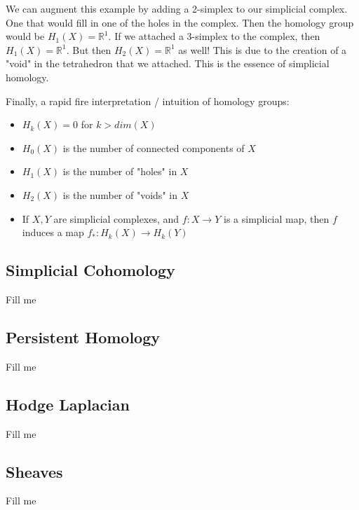 \documentclass[12pt]{article}
\theoremstyle{plain}
\theoremstyle{definition}
\begin{document}
We can augment this example by adding a 2-simplex to our simplicial complex. One that would fill in one of the holes
in the complex. Then the homology group would be $H_1(X) = \mathbb{R}^1$. If we attached a 3-simplex to the complex, 
then $H_1(X) = \mathbb{R}^1$. But then $H_2(X) = \mathbb{R}^1$ as well! This is due to the creation of a "void" in the
tetrahedron that we attached.  This is the essence of simplicial homology.

Finally, a rapid fire interpretation / intuition of homology groups:

\begin{itemize}

\item $H_k(X) = 0$ for $k > dim(X)$

\item $H_0(X)$ is the number of connected components of $X$

\item $H_1(X)$ is the number of "holes" in $X$

\item $H_2(X)$ is the number of "voids" in $X$

\item If $X, Y$ are simplicial complexes, and $f: X \to Y$ is a simplicial map, then $f$ induces a map $f_*: H_k(X) \to H_k(Y)$

\end{itemize}


\subsection{Simplicial Cohomology}

Fill me

\subsection{Persistent Homology}

Fill me

\subsection{Hodge Laplacian}

Fill me 

\subsection{Sheaves}

Fill me 
\end{document}
